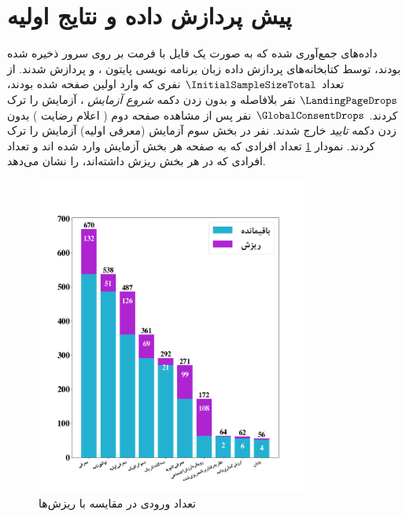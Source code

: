 \section{پیش پردازش داده و نتایج اولیه}
داده‌های جمع‌آوری شده که به صورت یک فایل با فرمت
بر روی سرور ذخیره شده بودند، توسط کتابخانه‌های پردازش داده زبان برنامه نویسی پایتون
\!،
و
پردازش شدند. از تعداد $\InitialSampleSizeTotal$
نفری که وارد اولین صفحه شده بودند،
$\LandingPageDrops$
نفر بلافاصله و بدون زدن دکمه
\textit{شروع آزمایش}
\!،
آزمایش را ترک کردند.
$\GlobalConsentDrops$
نفر پس از مشاهده صفحه دوم
\!(
اعلام رضایت
)
بدون زدن دکمه
\textit{تایید}
خارج شدند.
\otherPIIDisClosureDrops
نفر در بخش سوم آزمایش
\!(معرفی اولیه)
آزمایش را ترک کردند.
نمودار
\ref{fig:PageNotSubmitedDataFrame}
تعداد افرادی که به صفحه هر بخش آزمایش وارد شده اند و تعداد افرادی  که در هر بخش ریزش داشته‌اند، را نشان می‌دهد.
\begin{figure}[ht]
    \centerline{\includegraphics[width=0.8\textwidth]{./img/PageNotSubmitedDataFrame.png}}
    \caption{تعداد ورودی در مقایسه با ریزش‌ها}
    \label{fig:PageNotSubmitedDataFrame}
\end{figure}





